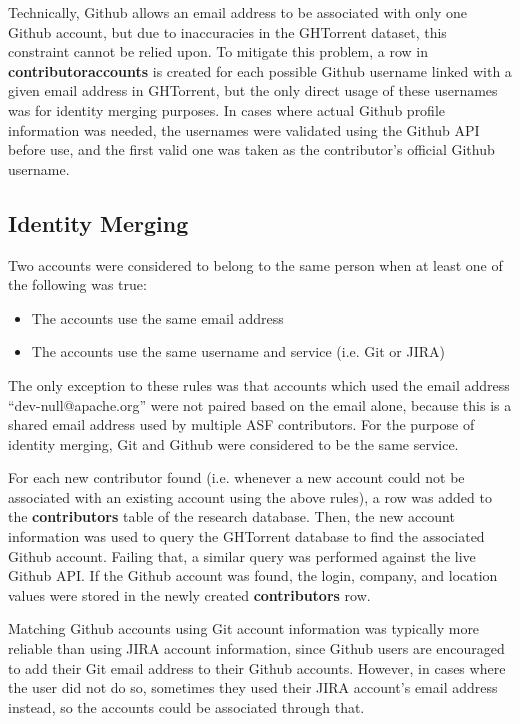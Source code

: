 Technically, Github allows an email address to be associated with only one Github account, but due to inaccuracies in the GHTorrent dataset, this constraint cannot be relied upon. To mitigate this problem, a row in \textbf{contributoraccounts} is created for each possible Github username linked with a given email address in GHTorrent, but the only direct usage of these usernames was for identity merging purposes. In cases where actual Github profile information was needed, the usernames were validated using the Github API before use, and the first valid one was taken as the contributor's official Github username.
\subsection{Identity Merging}
Two accounts were considered to belong to the same person when at least one of the following was true:
\begin{itemize}
	\item The accounts use the same email address
	\item The accounts use the same username and service (i.e. Git or JIRA)
\end{itemize}
The only exception to these rules was that accounts which used the email address ``dev-null@apache.org'' were not paired based on the email alone, because this is a shared email address used by multiple ASF contributors. For the purpose of identity merging, Git and Github were considered to be the same service.

For each new contributor found (i.e. whenever a new account could not be associated with an existing account using the above rules), a row was added to the \textbf{contributors} table of the research database. Then, the new account information was used to query the GHTorrent database to find the associated Github account. Failing that, a similar query was performed against the live Github API. If the Github account was found, the login, company, and location values were stored in the newly created \textbf{contributors} row.

Matching Github accounts using Git account information was typically more reliable than using JIRA account information, since Github users are encouraged to add their Git email address to their Github accounts. However, in cases where the user did not do so, sometimes they used their JIRA account's email address instead, so the accounts could be associated through that.

